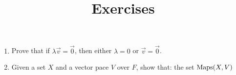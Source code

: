 \documentclass[a4paper]{article}
\title{Exercises}
\begin{document}
\begin{enumerate}
  \item Prove that if $\lambda \vec{v} = \vec{0}$, then either $\lambda = 0$ or $\vec{v} = \vec{0}$.
  \item Given a set $X$ and a vector pace $V$ over $F$, show that: the set $\text{Maps}(X,V)$
\end{enumerate}
\end{document}
